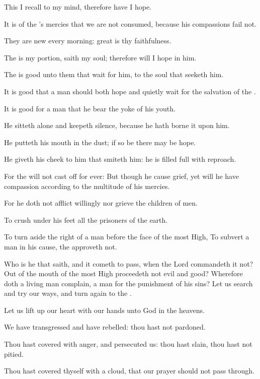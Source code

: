 \verse This I recall to my mind, therefore have I hope.

\verse It is of the \LORD's mercies that we are not consumed, because his compassions fail not.

\verse They are new every morning: great is thy faithfulness.

\verse The \LORD is my portion, saith my soul; therefore will I hope in him.

\verse The \LORD is good unto them that wait for him, to the soul that seeketh him.

\verse It is good that a man should both hope and quietly wait for the salvation of the \LORD.

\verse It is good for a man that he bear the yoke of his youth.

\verse He sitteth alone and keepeth silence, because he hath borne it upon him.

\verse He putteth his mouth in the dust; if so be there may be hope.

\verse He giveth his cheek to him that smiteth him: he is filled full with reproach.

\verse For the \LORD will not cast off for ever: \verse But though he cause grief, yet will he have compassion according to the multitude of his mercies.

\verse For he doth not afflict willingly nor grieve the children of men.

\verse To crush under his feet all the prisoners of the earth.

\verse To turn aside the right of a man before the face of the most High, \verse To subvert a man in his cause, the \LORD approveth not.

\verse Who is he that saith, and it cometh to pass, when the Lord commandeth it not?  \verse Out of the mouth of the most High proceedeth not evil and good?  \verse Wherefore doth a living man complain, a man for the punishment of his sins?  \verse Let us search and try our ways, and turn again to the \LORD.

\verse Let us lift up our heart with our hands unto God in the heavens.

\verse We have transgressed and have rebelled: thou hast not pardoned.

\verse Thou hast covered with anger, and persecuted us: thou hast slain, thou hast not pitied.

\verse Thou hast covered thyself with a cloud, that our prayer should not pass through.

